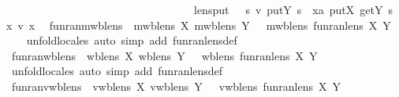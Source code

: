 \begin{isabellebody}
\ \ \ \ \ \ \ \ \ \ \ \ \ \ \ \ \ \ \ \ \ \ \ \ \ \ \ \ \ \ \ \ \ {\isacharcomma}\ lens{\isacharunderscore}put\ {\isacharequal}\ {\isasymlambda}\ s\ v{\isachardot}\ put\isactrlbsub Y\isactrlesub \ s\ {\isacharparenleft}{\isasymlambda}\ x{\isacharcolon}{\isacharcolon}{\isacharprime}a{\isachardot}\ put\isactrlbsub X\isactrlesub \ {\isacharparenleft}get\isactrlbsub Y\isactrlesub \ s\ x{\isacharparenright}\ {\isacharparenleft}v\ x{\isacharparenright}{\isacharparenright}\ {\isasymrparr}{\isachardoublequoteclose}\isanewline
\isanewline
{}\isamarkupfalse%
\ fun{\isacharunderscore}ran{\isacharunderscore}mwb{\isacharunderscore}lens{\isacharcolon}\ {\isachardoublequoteopen}{\isasymlbrakk}\ mwb{\isacharunderscore}lens\ X{\isacharsemicolon}\ mwb{\isacharunderscore}lens\ Y\ {\isasymrbrakk}\ {\isasymLongrightarrow}\ mwb{\isacharunderscore}lens\ {\isacharparenleft}fun{\isacharunderscore}ran{\isacharunderscore}lens\ X\ Y{\isacharparenright}{\isachardoublequoteclose}\isanewline
%
\isadelimproof
\ \ %
\endisadelimproof
%
\isatagproof
{}\isamarkupfalse%
\ {\isacharparenleft}unfold{\isacharunderscore}locales{\isacharcomma}\ auto\ simp\ add{\isacharcolon}\ fun{\isacharunderscore}ran{\isacharunderscore}lens{\isacharunderscore}def{\isacharparenright}%
\endisatagproof
{\isafoldproof}%
%
\isadelimproof
\isanewline
%
\endisadelimproof
\isanewline
{}\isamarkupfalse%
\ fun{\isacharunderscore}ran{\isacharunderscore}wb{\isacharunderscore}lens{\isacharcolon}\ {\isachardoublequoteopen}{\isasymlbrakk}\ wb{\isacharunderscore}lens\ X{\isacharsemicolon}\ wb{\isacharunderscore}lens\ Y\ {\isasymrbrakk}\ {\isasymLongrightarrow}\ wb{\isacharunderscore}lens\ {\isacharparenleft}fun{\isacharunderscore}ran{\isacharunderscore}lens\ X\ Y{\isacharparenright}{\isachardoublequoteclose}\isanewline
%
\isadelimproof
\ \ %
\endisadelimproof
%
\isatagproof
{}\isamarkupfalse%
\ {\isacharparenleft}unfold{\isacharunderscore}locales{\isacharcomma}\ auto\ simp\ add{\isacharcolon}\ fun{\isacharunderscore}ran{\isacharunderscore}lens{\isacharunderscore}def{\isacharparenright}%
\endisatagproof
{\isafoldproof}%
%
\isadelimproof
\isanewline
%
\endisadelimproof
\isanewline
{}\isamarkupfalse%
\ fun{\isacharunderscore}ran{\isacharunderscore}vwb{\isacharunderscore}lens{\isacharcolon}\ {\isachardoublequoteopen}{\isasymlbrakk}\ vwb{\isacharunderscore}lens\ X{\isacharsemicolon}\ vwb{\isacharunderscore}lens\ Y\ {\isasymrbrakk}\ {\isasymLongrightarrow}\ vwb{\isacharunderscore}lens\ {\isacharparenleft}fun{\isacharunderscore}ran{\isacharunderscore}lens\ X\ Y{\isacharparenright}{\isachardoublequoteclose}\isanewline

\end{isabellebody}
